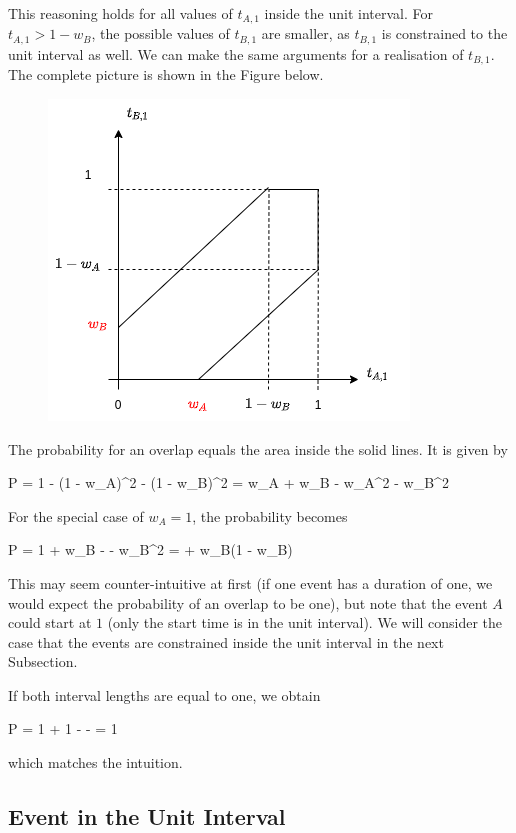 This reasoning holds for all values of $t_{A,1}$ inside the unit interval. For $t_{A,1} > 1-w_B$, the possible values of $t_{B,1}$ are smaller, as $t_{B,1}$ is constrained to the unit interval as well. We can make the same arguments for a realisation of $t_{B,1}$. The complete picture is shown in the Figure below.

\begin{figure}[H]
    \centering
    \includegraphics[scale=0.75]{images/2021-12-21_conc_events_2.png}
\end{figure}

The probability for an overlap equals the area inside the solid lines. It is given by

\bee
P = 1 - (1 - w_A)^2 - (1 - w_B)^2 = w_A + w_B -  w_A^2 -  w_B^2
\eee

For the special case of $w_A = 1$, the probability becomes

\bee
P = 1 + w_B -  -  w_B^2 =  + w_B(1 - w_B)
\eee

This may seem counter-intuitive at first (if one event has a duration of one, we would expect the probability of an overlap to be one), but note that the event $A$ could start at $1$ (only the start time is in the unit interval). We will consider the case that the events are constrained inside the unit interval in the next Subsection.

If both interval lengths are equal to one, we obtain

\bee
P = 1 + 1 -  -  = 1
\eee

which matches the intuition.


\subsection{Event in the Unit Interval}

